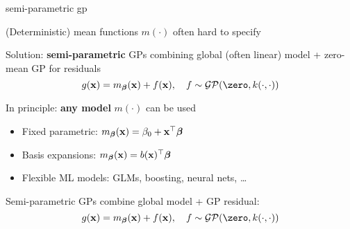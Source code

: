 \documentclass[11pt,compress,t,notes=noshow, xcolor=table]{beamer}
\begin{document}
\begin{framei}[sep=L]{semi-parametric gp}
\item (Deterministic) mean functions $m(\cdot)$ often hard to specify
\item Solution: \textbf{semi-parametric} GPs combining global (often linear) model + zero-mean GP for residuals
$$g(\xv) = m_{\bm{\beta}}(\xv) + \fx, \quad f  \sim \GPzk$$

\item In principle: \textbf{any model} $m(\cdot)$ can be used
\begin{itemize}
  \item Fixed parametric: $m_{\bm{\beta}}(\mathbf{x})=\beta_0+\mathbf{x}^\top\bm{\beta}$
  \item Basis expansions: $m_{\bm{\beta}}(\mathbf{x})=b(\mathbf{x})^\top\bm{\beta}$
  \item Flexible ML models: GLMs, boosting, neural nets, \dots
\end{itemize}

\item Semi-parametric GPs combine global model + GP residual:
$$g(\xv) = m_{\bm{\beta}}(\xv) + f(\xv), \quad f\sim\GPzk$$

\end{framei}


\end{document}
